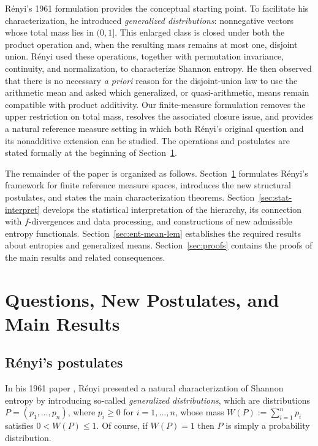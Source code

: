 \documentclass[reqno]{amsart}
\begin{document}
R\'enyi's 1961 formulation \cite{Ren61} provides the conceptual starting point. To facilitate his characterization, he introduced \textit{generalized distributions}: nonnegative vectors whose total mass lies in $(0,1]$. This enlarged class is closed under both the product operation and, when the resulting mass remains at most one, disjoint union. R\'enyi used these operations, together with permutation invariance, continuity, and normalization, to characterize Shannon entropy. He then observed that there is no necessary \textit{a priori} reason for the disjoint-union law to use the arithmetic mean and asked which generalized, or quasi-arithmetic, means remain compatible with product additivity. Our finite-measure formulation removes the upper restriction on total mass, resolves the associated closure issue, and provides a natural reference measure setting in which both R\'enyi's original question and its nonadditive extension can be studied. The operations and postulates are stated formally at the beginning of Section~\ref{sec:main}.

The remainder of the paper is organized as follows. Section~\ref{sec:main} formulates R\'enyi's framework for finite reference measure spaces, introduces the new structural postulates, and states the main characterization theorems. Section~\ref{sec:stat-interpret} develops the statistical interpretation of the hierarchy, its connection with $f$-divergences and data processing, and constructions of new admissible entropy functionals. Section~\ref{sec:ent-mean-lem} establishes the required results about entropies and generalized means. Section~\ref{sec:proofs} contains the proofs of the main results and related consequences.





\section{Questions, New Postulates, and Main Results}
\label{sec:main}

\subsection{R\'enyi's postulates}

In his 1961 paper \cite{Ren61}, R\'enyi presented a natural characterization of Shannon entropy by introducing  so-called \textit{generalized distributions}, which are  distributions $P = (p_1, \dots, p_n)$, where $p_i \geq 0$ for $i=1, \dots, n$, whose mass $W(P) := \sum_{i=1}^n p_i$ satisfies $0 < W(P) \leq 1.$ Of course, if $W(P)=1$ then $P$ is simply a probability distribution. 
\end{document}

